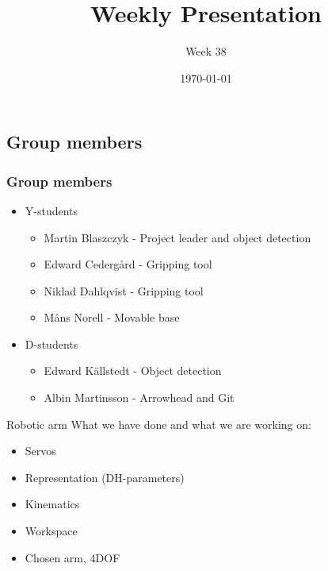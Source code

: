 \documentclass{beamer}
\title{Weekly Presentation}
\subtitle{Week 38}
\author{}
\institute{Luleå University of Technology}
\date{\today}
\begin{document}
\begin{frame}
    \titlepage
\end{frame}




\begin{frame}
    \subsection{Group members}
    \frametitle{Group members }
    \begin{itemize}
        \item Y-students
        \begin{itemize}
            \item Martin Blaszczyk - Project leader and object detection
            \item Edward Cedergård - Gripping tool
            \item Niklad Dahlqvist - Gripping tool
            \item Måns Norell - Movable base
        \end{itemize}
        \item D-students
        \begin{itemize}
            \item Edward Källstedt - Object detection
            \item Albin Martinsson - Arrowhead and Git
        \end{itemize}  
    \end{itemize}
\end{frame}




\begin{frame}{Robotic arm}
What we have done and what we are working on:
    \begin{itemize}
        \item Servos
        \item Representation (DH-parameters)
        \item Kinematics
        \item Workspace
        \item Chosen arm, 4DOF
    \end{itemize}
\end{frame}


\end{document}

